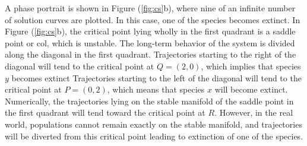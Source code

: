 A phase portrait is shown in Figure (\ref{fig:cs}b), where nine of an infinite number of solution curves are plotted.
In this case, one of the species becomes extinct.
In Figure (\ref{fig:cs}b), the critical point lying wholly in the first quadrant is a
saddle point or col, which is unstable.
The long-term behavior of the system is divided along the diagonal in the first quadrant.
Trajectories starting to the right of the diagonal will tend to the critical point at $Q =(2, 0)$, which implies that species $y$ becomes extinct
Trajectories starting to the left of the diagonal will tend to the critical point at $P =(0, 2)$, which means that species $x$ will become extinct.
Numerically, the trajectories lying on the stable manifold of the saddle point in the first quadrant will tend toward the critical point at $R$.
However, in the real world, populations cannot remain exactly on the stable manifold, and trajectories will be diverted from this critical point leading to extinction of one of the species.